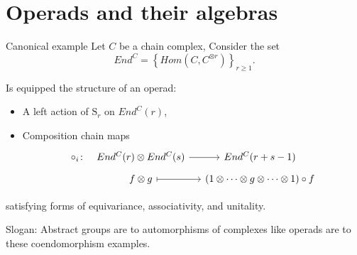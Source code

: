 \documentclass[10pt,t]{beamer}
\renewcommand{\S}{\mathrm{S}}
\begin{document}
\section{Operads and their algebras}

\begin{frame}[fragile]{Canonical example}
	Let $C$ be a chain complex, Consider the set
	\begin{equation*}
	End^C = \left\{Hom(C, C^{\otimes r})\right\}_{r \geq 1}.
	\end{equation*}
	
	\pause
	
	Is equipped the structure of an operad:
	\begin{itemize}
		\item A left action of $\S_r$ on $End^C(r)$,
		\item Composition chain maps
		\begin{equation*}
		\begin{tikzcd}[column sep=small, row sep=tiny]
		\circ_i \colon &[-10pt] End^C(r) \otimes End^C(s) \arrow[r] & End^C(r+s-1) \\
		& f \otimes g \arrow[r, |->] & (1 \otimes \cdots \otimes g \otimes \cdots \otimes 1) \circ f 
		\end{tikzcd}
		\end{equation*}
	\end{itemize}
	satisfying forms of equivariance, associativity, and unitality.
	
	\pause \vspace*{10pt}
	
	\textcolor{pblue}{Slogan:} Abstract groups are to automorphisms of complexes like operads are to these coendomorphism examples.
\end{frame}
\end{document}
